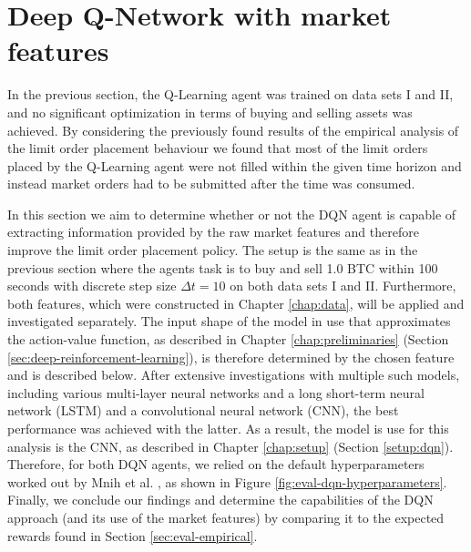 \section{Deep Q-Network with market features}
\label{sec:eval-dqn}
In the previous section, the Q-Learning agent was trained on data sets I and II, and no significant optimization in terms of buying and selling assets was achieved.
By considering the previously found results of the empirical analysis of the limit order placement behaviour we found that most of the limit orders placed by the Q-Learning agent were not filled within the given time horizon and instead market orders had to be submitted after the time was consumed.

In this section we aim to determine whether or not the DQN agent is capable of extracting information provided by the raw market features and therefore improve the limit order placement policy.
The setup is the same as in the previous section where the agents task is to buy and sell 1.0 BTC within 100 seconds with discrete step size $\Delta{t}=10$ on both data sets I and II.
Furthermore, both features, which were constructed in Chapter \ref{chap:data}, will be applied and investigated separately.
The input shape of the model in use that approximates the action-value function, as described in Chapter \ref{chap:preliminaries} (Section \ref{sec:deep-reinforcement-learning}), is therefore determined by the chosen feature and is described below.
After extensive investigations with multiple such models, including various multi-layer neural networks\cite{svozil1997introduction} and a long short-term neural network (LSTM)\cite{gers1999learning} and a convolutional neural network (CNN), the best performance was achieved with the latter.
As a result, the model is use for this analysis is the CNN, as described in Chapter \ref{chap:setup} (Section \ref{setup:dqn}).
Therefore, for both DQN agents, we relied on the default hyperparameters worked out by Mnih et al. \cite{mnih2015human}, as shown in Figure \ref{fig:eval-dqn-hyperparameters}.
Finally, we conclude our findings and determine the capabilities of the DQN approach (and its use of the market features) by comparing it to the expected rewards found in Section \ref{sec:eval-empirical}.
